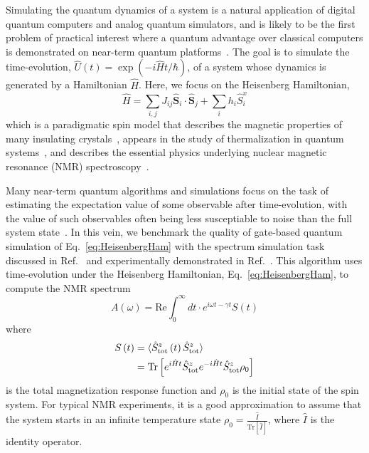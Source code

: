 \documentclass[prx,aps,twocolumn,showpacs,superscriptaddress,10pt]{revtex4-1}
\begin{document}
Simulating the quantum dynamics of a system is a natural application of digital quantum computers and analog quantum simulators, and is likely to be the first problem of practical interest where a quantum advantage over classical computers is demonstrated on near-term quantum platforms~\cite{Childs2018}. The goal is to simulate the time-evolution, $\hat{U}\left(t\right)=\exp\left(-i\hat{H}t/\hbar\right)$, of a system whose dynamics is generated by a Hamiltonian $\hat{H}$. Here, we focus on the Heisenberg Hamiltonian,
\begin{equation}\label{eq:HeisenbergHam}
\hat{H}=\sum_{i,j}J_{ij}\hat{\mathbf{S}}_{i}\cdot\hat{\mathbf{S}}_{j}+\sum_{i}h_{i}\hat{S}_{i}^{x}
\end{equation}
which is a paradigmatic spin model that describes the magnetic properties of many insulating crystals~\cite{Dagotto1994}, appears in the study of thermalization in quantum systems~\cite{Nandkishore2015, Luitz2015, Pal2010}, and describes the essential physics underlying nuclear magnetic resonance (NMR) spectroscopy~\cite{Sels2020}. 

Many near-term quantum algorithms and simulations focus on the task of estimating the expectation value of some observable after time-evolution, with the value of such observables often being less susceptiable to noise than the full system state~\cite{Temme2017}. In this vein, we benchmark the quality of gate-based quantum simulation of Eq.~\eqref{eq:HeisenbergHam} with the spectrum simulation task discussed in Ref.~\cite{Sels2020} and experimentally demonstrated in Ref.~\cite{Seetharam2021_NMRIon}. This algorithm uses time-evolution under the Heisenberg Hamiltonian, Eq.~\eqref{eq:HeisenbergHam}, to compute the NMR spectrum
\begin{equation}\label{eq:Spectrum}
A\left(\omega\right)=\text{Re}\int_{0}^{\infty}dt\cdot e^{i\omega t-\gamma t}S\left(t\right)
\end{equation}
where 
\begin{align}
S\left(t\right) & =\braket{\hat{S}_{\text{tot}}^{z}\left(t\right)\hat{S}_{\text{tot}}^{z}}\\
& =\text{Tr}\left[e^{i\hat{H}t}\hat{S}_{\text{tot}}^{z}e^{-i\hat{H}t}\hat{S}_{\text{tot}}^{z}\rho_{0}\right]
\end{align}
is the total magnetization response function and $\rho_{0}$ is the initial state of the spin system. For typical NMR experiments, it is a good approximation to assume that the system starts in an infinite temperature state  $\rho_{0}=\frac{\hat{I}}{\text{Tr}\left[\hat{I}\right]}$, where $\hat{I}$ is the identity operator.
\end{document}
